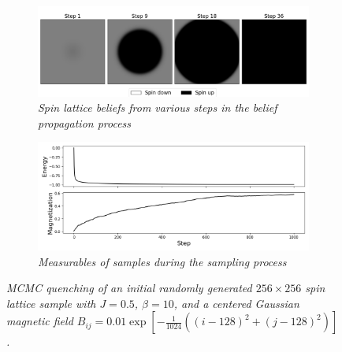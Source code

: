 \documentclass{article}
\begin{document}
\begin{figure}
    \begin{subfigure}{\textwidth}
        \includegraphics[width=\textwidth]{report_bp_gaussian}
        \centering
        \caption{\textit{Spin lattice beliefs from various steps in the belief propagation process}}
        \label{fig:1a}
    \end{subfigure}
    \begin{subfigure}{\textwidth}
        \includegraphics[width=\textwidth]{report_mcmc_gaussian_measurables}
        \centering
        \caption{\textit{Measurables of samples during the sampling process}}
        \label{fig:1b}
    \end{subfigure}
    \centering
    \caption{\textit{
        MCMC quenching of an initial randomly generated $256 \times 256$ spin 
        lattice sample with $J = 0.5$, $\beta = 10$, and a centered Gaussian 
        magnetic field
        $B_{ij} = 0.01 \exp [-\frac{1}{1024}((i-128)^2 + (j-128)^2)]$. 
    }}
    \label{fig:mcmc_gaussian}
\end{figure}

\newpage

\end{document}
